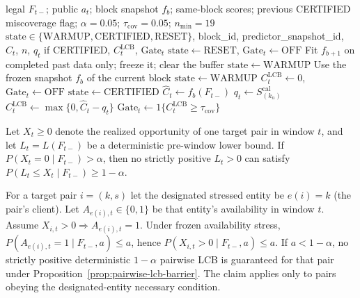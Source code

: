 \begin{algorithm}[t]
\caption{Aggregate coverage certificate (diagnostic Gate)}
\label{alg:agg_certificate}
\begin{algorithmic}[1]
\REQUIRE legal $F_{t-}$; public $a_t$; block snapshot $f_b$; same-block scores;
previous CERTIFIED miscoverage flag; $\alpha=0.05$; $\tau_{\mathrm{cov}}=0.05$; $n_{\min}=19$
\ENSURE $\mathrm{state}\in\{\mathrm{WARMUP},\mathrm{CERTIFIED},\mathrm{RESET}\}$,
block\_id, predictor\_snapshot\_id, $\widehat C_t$, $n$, $q_t$ if CERTIFIED,
$C^{\mathrm{LCB}}_t$, $\mathrm{Gate}_t$
\STATE $\mathrm{state}\leftarrow\mathrm{RESET}$, $\mathrm{Gate}_t\leftarrow\mathrm{OFF}$
\STATE Fit $f_{b+1}$ on completed past data only; freeze it; clear the buffer
\STATE $\mathrm{state}\leftarrow\mathrm{WARMUP}$
\ELSE
\STATE Use the frozen snapshot $f_b$ of the current block
\STATE $\mathrm{state}\leftarrow\mathrm{WARMUP}$
\STATE $C^{\mathrm{LCB}}_t\leftarrow 0$, $\mathrm{Gate}_t\leftarrow\mathrm{OFF}$
\ELSE
\STATE $\mathrm{state}\leftarrow\mathrm{CERTIFIED}$ 
\STATE $\widehat C_t\leftarrow f_b(F_{t-})$
\STATE $q_t\leftarrow S_{(k_n)}^{\mathrm{cal}}$ 
\STATE $C^{\mathrm{LCB}}_t\leftarrow\max\{0,\widehat C_t-q_t\}$
\STATE $\mathrm{Gate}_t\leftarrow 1\{C^{\mathrm{LCB}}_t\ge\tau_{\mathrm{cov}}\}$
\ENDIF
\ENDIF
\end{algorithmic}
\end{algorithm}

\begin{proposition}
\label{prop:pairwise-lcb-barrier}
Let $X_t\ge 0$ denote the realized opportunity of one target pair in window
$t$, and let $L_t=L(F_{t-})$ be a deterministic pre-window lower bound.  If
$P(X_t=0\mid F_{t-})>\alpha$, then no strictly positive $L_t>0$ can satisfy
$P(L_t\le X_t\mid F_{t-})\ge 1-\alpha$.
\end{proposition}

\begin{corollary}
\label{cor:availability-barrier}
For a target pair $i=(k,s)$ let the designated stressed entity be $e(i)=k$
(the pair's client).  Let $A_{e(i),t}\in\{0,1\}$ be that entity's availability
in window $t$.  Assume $X_{i,t}>0\Rightarrow A_{e(i),t}=1$.  Under frozen
availability stress, $P(A_{e(i),t}=1\mid F_{t-},a)\le a$, hence
$P(X_{i,t}>0\mid F_{t-},a)\le a$.  If $a<1-\alpha$, no strictly positive
deterministic $1-\alpha$ pairwise LCB is guaranteed for that pair under
Proposition~\ref{prop:pairwise-lcb-barrier}.  The claim applies only to pairs
obeying the designated-entity necessary condition.
\end{corollary}

